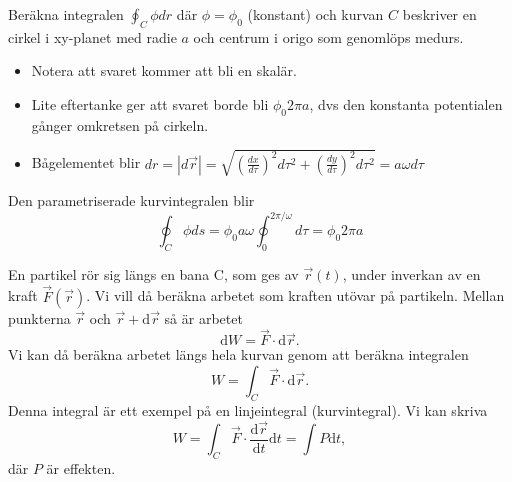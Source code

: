 \documentclass[%
oneside,                 %
final,                   %
10pt]{article}
\newenvironment{notice_mdfboxadmon}[1][]{
\begin{notice_mdfboxmdframed}[frametitle=#1]
}
{
\end{notice_mdfboxmdframed}
}
\begin{document}
\begin{notice_mdfboxadmon}

Beräkna integralen $\oint_C \phi dr$ där $\phi = \phi_0$ (konstant) och kurvan $C$ beskriver en cirkel i xy-planet med radie $a$ och centrum i origo som genomlöps medurs.

\begin{itemize}
\item Notera att svaret kommer att bli en skalär.

\item Lite eftertanke ger att svaret borde bli $\phi_0 2 \pi a$, dvs den konstanta potentialen gånger omkretsen på cirkeln.

\item Bågelementet blir $dr = |d\vec{r}| = \sqrt{\left( \frac{dx}{d\tau} \right)^2 d\tau^2 + \left( \frac{dy}{d\tau} \right)^2 d\tau^2 } = a \omega d\tau$
\end{itemize}

\noindent
Den parametriserade kurvintegralen blir
\begin{equation}
\oint_C \phi ds = \phi_0 a \omega \oint_0^{2\pi/\omega}  d\tau = \phi_0 2 \pi a 
\end{equation}
\end{notice_mdfboxadmon} %




\begin{notice_mdfboxadmon}

En partikel rör sig längs en bana C, som ges av $\vec{r}(t)$, under inverkan av en kraft $\vec{F}(\vec{r})$.  Vi vill då beräkna arbetet som kraften utövar på partikeln.  Mellan punkterna $\vec{r}$ och $\vec{r}+\mbox{d}\vec{r}$ så är arbetet
\begin{equation}
  \mbox{d}W = \vec{F}\cdot \mbox{d}\vec{r}.
\end{equation}
Vi kan då beräkna arbetet längs hela kurvan genom att beräkna integralen
\begin{equation}
  W = \int_C \vec{F}\cdot \mbox{d}\vec{r}.
\end{equation}
Denna integral är ett exempel på en linjeintegral (kurvintegral). Vi kan skriva
\begin{equation}
  W = \int_C \vec{F} \cdot \frac{\mbox{d}\vec{r}}{\mbox{d}t} \mbox{d}t = \int P \mbox{d}t,
\end{equation}
där $P$ är effekten.
\end{notice_mdfboxadmon} %
\end{document}
